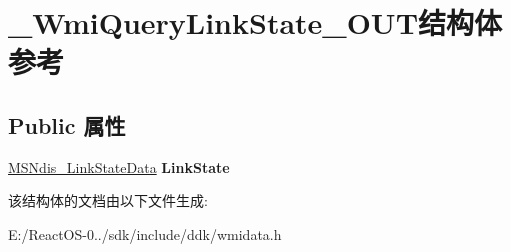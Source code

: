 \hypertarget{struct___wmi_query_link_state___o_u_t}{}\section{\+\_\+\+Wmi\+Query\+Link\+State\+\_\+\+O\+U\+T结构体 参考}
\label{struct___wmi_query_link_state___o_u_t}
\subsection*{Public 属性}
\begin{DoxyCompactItemize}
\item 
\mbox{\label{struct___wmi_query_link_state___o_u_t_a8c895522839c5834129156970721bbe2}} 
\hyperlink{struct___m_s_ndis___link_state_data}{M\+S\+Ndis\+\_\+\+Link\+State\+Data} {\bfseries Link\+State}
\end{DoxyCompactItemize}


该结构体的文档由以下文件生成\+:\begin{DoxyCompactItemize}
\item 
E\+:/\+React\+O\+S-\/0../sdk/include/ddk/wmidata.\+h\end{DoxyCompactItemize}
